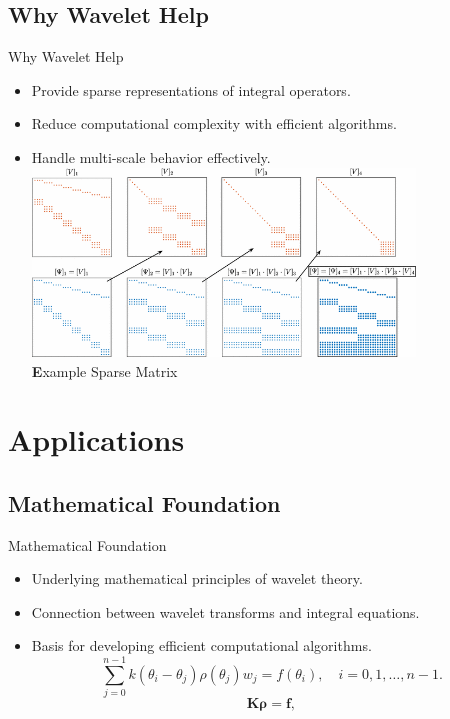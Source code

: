 \documentclass{beamer}
\begin{document}
\subsection{Why Wavelet Help}
\begin{frame}{Why Wavelet Help}
    \begin{itemize}
        \item Provide sparse representations of integral operators.
        \item Reduce computational complexity with efficient algorithms.
        \item Handle multi-scale behavior effectively.
        \vfil
        \centering
        \includegraphics[width=0.8\textwidth]{Example_Sparse_Matrix.png} %
        \\[0.2cm] %
        {\small \textbf Example Sparse Matrix} %
    \end{itemize}
\end{frame}

\section{Applications}
\subsection{Mathematical Foundation}
\begin{frame}{Mathematical Foundation}
    \begin{itemize}
        \item Underlying mathematical principles of wavelet theory.
        \item Connection between wavelet transforms and integral equations.
        \item Basis for developing efficient computational algorithms.
        \[
              \sum_{j=0}^{n-1} k(\theta_i - \theta_j) \rho(\theta_j) w_j = f(\theta_i), \quad i = 0, 1, \dots, n-1.
        \]
        \[
                \mathbf{K} \boldsymbol{\rho} = \mathbf{f},
        \]
    \end{itemize}
\end{frame}
\end{document}
